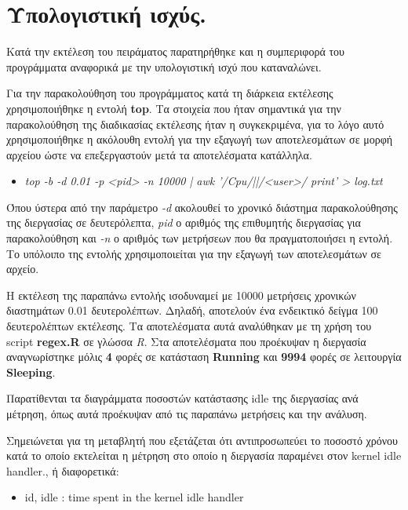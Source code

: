 \documentclass[12pt, a4paper]{article}
\begin{document}
\newpage

\section{Υπολογιστική ισχύς.}
Κατά την εκτέλεση του πειράματος παρατηρήθηκε και η συμπεριφορά του προγράμματα αναφορικά με την υπολογιστική ισχύ που καταναλώνει.

\justify
Για την παρακολούθηση του προγράμματος κατά τη διάρκεια εκτέλεσης χρησιμοποιήθηκε η εντολή \textlatin{\textbf{top}}.\cite{manual} Τα στοιχεία που ήταν σημαντικά για την παρακολούθηση της διαδικασίας εκτέλεσης ήταν η συγκεκριμένα, για το λόγο αυτό χρησιμοποιήθηκε η ακόλουθη εντολή για την εξαγωγή των αποτελεσμάτων σε μορφή αρχείου ώστε να επεξεργαστούν μετά τα αποτελέσματα κατάλληλα.
\begin{itemize}
    \item \textlatin{\textit{top -b -d 0.01 -p <pid> -n 10000 | awk '/Cpu/||/<user>/ {print}'      > log.txt}}
\end{itemize}
Όπου ύστερα από την παράμετρο \textlatin{\textit{-d}} ακολουθεί το χρονικό διάστημα παρακολούθησης της διεργασίας σε δευτερόλεπτα, \textlatin{\textit{pid}} ο αριθμός της επιθυμητής διεργασίας για παρακολούθηση και \textlatin{\textit{-n}} ο αριθμός των μετρήσεων που θα πραγματοποιήσει η εντολή. Το υπόλοιπο της εντολής χρησιμοποιείται για την εξαγωγή των αποτελεσμάτων σε αρχείο.

\justify 
Η εκτέλεση της παραπάνω εντολής ισοδυναμεί με 10000 μετρήσεις χρονικών διαστημάτων 0.01 δευτερολέπτων. Δηλαδή, αποτελούν ένα ενδεικτικό δείγμα 100 δευτερολέπτων εκτέλεσης. Τα αποτελέσματα αυτά αναλύθηκαν με τη χρήση του \textlatin{script} \textlatin{\textbf{regex.R}} σε γλώσσα \textlatin{\textit{R}}. 
\justify
Στα αποτελέσματα που προέκυψαν η διεργασία αναγνωρίστηκε μόλις \textbf{4} φορές σε κατάσταση \textlatin{\textbf{Running}} και \textbf{9994} φορές σε λειτουργία \textlatin{\textbf{Sleeping}}. 

\justify
Παρατίθενται τα διαγράμματα ποσοστών κατάστασης \textlatin{idle} της διεργασίας ανά μέτρηση, όπως αυτά προέκυψαν από τις παραπάνω μετρήσεις και την ανάλυση. 

\justify
Σημειώνεται για τη μεταβλητή που εξετάζεται ότι αντιπροσωπεύει το ποσοστό χρόνου κατά το οποίο εκτελείται η μέτρηση στο οποίο η διεργασία παραμένει στον \textlatin{kernel idle handler}.\cite{manual}, ή διαφορετικά:
\begin{itemize}
    \item \textlatin{id, idle    : time spent in the kernel idle handler}\cite{manual}
\end{itemize}
\end{document}
